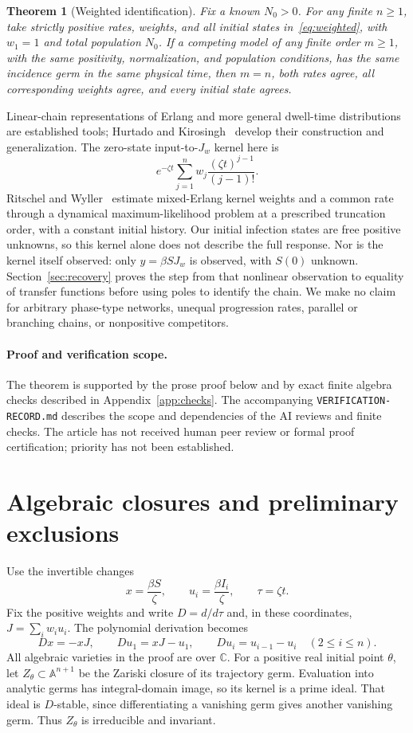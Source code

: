 \documentclass[11pt]{article}
\newtheorem{theorem}{Theorem}[section]
\theoremstyle{remark}\newtheorem{remark}[theorem]{Remark}
\newcommand{\C}{\mathbb C}
\newcommand{\A}{\mathbb A}
\begin{document}
\begin{theorem}[Weighted identification]\label{thm:main}
Fix a known $N_0>0$. For any finite $n\geq1$, take strictly positive rates, weights, and all initial states in~\eqref{eq:weighted}, with $w_1=1$ and total population $N_0$. If a competing model of any finite order $m\geq1$, with the same positivity, normalization, and population conditions, has the same incidence germ in the same physical time, then $m=n$, both rates agree, all corresponding weights agree, and every initial state agrees.
\end{theorem}

Linear-chain representations of Erlang and more general dwell-time distributions are established tools; Hurtado and Kirosingh~\cite{HK} develop their construction and generalization. The zero-state input-to-$J_w$ kernel here is
\[
 e^{-\zeta t}\sum_{j=1}^n w_j\frac{(\zeta t)^{j-1}}{(j-1)!}.
\]
Ritschel and Wyller~\cite{RW} estimate mixed-Erlang kernel weights and a common rate through a dynamical maximum-likelihood problem at a prescribed truncation order, with a constant initial history. Our initial infection states are free positive unknowns, so this kernel alone does not describe the full response. Nor is the kernel itself observed: only $y=\beta S J_w$ is observed, with $S(0)$ unknown. Section~\ref{sec:recovery} proves the step from that nonlinear observation to equality of transfer functions before using poles to identify the chain. We make no claim for arbitrary phase-type networks, unequal progression rates, parallel or branching chains, or nonpositive competitors.

\paragraph{Proof and verification scope.}
The theorem is supported by the prose proof below and by exact finite algebra checks described in Appendix~\ref{app:checks}. The accompanying \texttt{VERIFICATION-RECORD.md} describes the scope and dependencies of the AI reviews and finite checks. The article has not received human peer review or formal proof certification; priority has not been established.

\section{Algebraic closures and preliminary exclusions}\label{sec:prelim}
Use the invertible changes
\[
 x=\frac{\beta S}{\zeta},\qquad u_i=\frac{\beta I_i}{\zeta},
 \qquad \tau=\zeta t.
\]
Fix the positive weights and write $D=d/d\tau$ and, in these coordinates, $J=\sum_i w_i u_i$. The polynomial derivation becomes
\begin{equation}\label{eq:D}
 Dx=-xJ,\qquad Du_1=xJ-u_1,\qquad Du_i=u_{i-1}-u_i\quad(2\leq i\leq n).
\end{equation}
All algebraic varieties in the proof are over $\C$. For a positive real initial point $\theta$, let $Z_\theta\subset\A^{n+1}$ be the Zariski closure of its trajectory germ. Evaluation into analytic germs has integral-domain image, so its kernel is a prime ideal. That ideal is $D$-stable, since differentiating a vanishing germ gives another vanishing germ. Thus $Z_\theta$ is irreducible and invariant.
\end{document}

